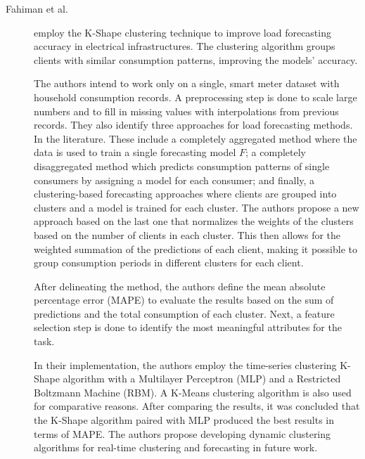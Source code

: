 \begin{description}
    \item[Fahiman et al.]\cite{Fahiman.Erfani.ea_Improvingloadforecasting_2017} employ the K-Shape clustering technique to improve load forecasting accuracy in electrical infrastructures. The clustering algorithm groups clients with similar consumption patterns, improving the models' accuracy. 
    
    The authors intend to work only on a single, smart meter dataset with household consumption records. A preprocessing step is done to scale large numbers and to fill in missing values with interpolations from previous records. They also identify three approaches for load forecasting methods. In the literature. These include a completely aggregated method where the data is used to train a single forecasting model $F$; a completely disaggregated method which predicts consumption patterns of single consumers by assigning a model for each consumer; and finally, a clustering-based forecasting approaches where clients are grouped into clusters and a model is trained for each cluster. The authors propose a new approach based on the last one that normalizes the weights of the clusters based on the number of clients in each cluster. This then allows for the weighted summation of the predictions of each client, making it possible to group consumption periods in different clusters for each client.

    After delineating the method, the authors define the mean absolute percentage error (MAPE) to evaluate the results based on the sum of predictions and the total consumption of each cluster. Next, a feature selection step is done to identify the most meaningful attributes for the task. 

    In their implementation, the authors employ the time-series clustering K-Shape algorithm with a Multilayer Perceptron (MLP) and a Restricted Boltzmann Machine (RBM). A K-Means clustering algorithm is also used for comparative reasons. After comparing the results, it was concluded that the K-Shape algorithm paired with MLP produced the best results in terms of MAPE. The authors propose developing dynamic clustering algorithms for real-time clustering and forecasting in future work.
\end{description}

